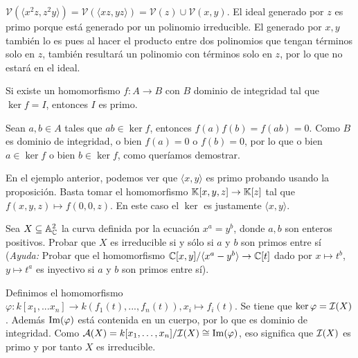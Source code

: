 \documentclass[ACGA.tex]{subfiles}
\begin{document}
\begin{ej}
$\mathcal{V}(\langle x^2z,z^2y\rangle)=\mathcal{V}(\langle xz,yz\rangle)=\mathcal{V}(z)\cup\mathcal{V}(x,y)$. El ideal generado por $z$ es primo porque está generado por un polinomio irreducible. El generado por $x,y$ también lo es pues al hacer el producto entre dos polinomios que tengan términos solo en $z$, también resultará un polinomio con términos solo en $z$, por lo que no estará en el ideal.
\end{ej}

\begin{prop}
Si existe un homomorfismo $f:A\to B$ con $B$ dominio de integridad tal que $\ker{f}=I$, entonces $I$ es primo.
\end{prop}

\begin{dem}
Sean $a,b\in A$ tales que $ab\in\ker{f}$, entonces $f(a)f(b)=f(ab)=0$. Como $B$ es dominio de integridad, o bien $f(a)=0$ o $f(b)=0$, por lo que o bien $a\in\ker{f}$ o bien $b\in\ker{f}$, como queríamos demostrar.\QED
\end{dem}

\begin{ej}\label{ej}
En el ejemplo anterior, podemos ver que $\langle x,y\rangle$ es primo probando usando la proposición.  Basta tomar el homomorfismo $\mathbb{K}[x,y,z]\to\mathbb{K}[z]$ tal que $f(x,y,z)\mapsto f(0,0,z)$. En este caso el $\ker$ es justamente $\langle x,y\rangle$.
\end{ej}

\begin{ejer}
 Sea $X\subseteq\mathbb{A}^2_{\mathbb{C}}$ la curva definida por la ecuación $x^a=y^b$, donde $a,b$ son enteros positivos. Probar que $X$ es irreducible si y sólo si $a$ y $b$ son primos entre sí (\emph{Ayuda: } Probar que el homomorfismo $\mathbb{C}[x,y]/\langle x^a-y^b\rangle\to\mathbb{C}[t]$ dado por $x\mapsto t^b$, $y\mapsto t^a$ es inyectivo si $a$ y $b$ son primos entre sí).
\end{ejer}
\begin{solucion}

Definimos el homomorfismo $\varphi:k[x_1,...x_n]\rightarrow k(f_1(t),...,f_n(t)), x_i \mapsto f_i(t)$. Se tiene que $\ker{\varphi}=\mathcal{I}(X)$. Además $\operatorname{Im}(\varphi)$ está contenida en un cuerpo, por lo que es dominio de integridad. Como $\mathcal{A}(X)=k[x_1,\dots,x_n]/\mathcal{I}(X) \cong \operatorname{Im}(\varphi)$, eso significa que $\mathcal{I}(X)$ es primo y por tanto $X$ es irreducible.

\end{solucion}
\end{document}
